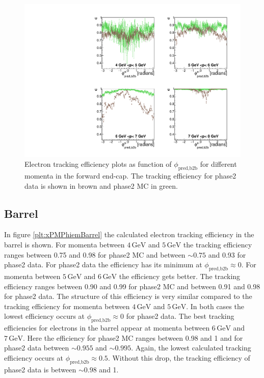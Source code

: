 \documentclass[a4paper,11pt,twosided,final,german,openbib,pdftex,listof=totoc,bibliography=totoc]{scrbook}
\begin{document}
\begin{figure}[!htbp]
	\centering
	\includegraphics[width=\textwidth]{Plots/master/xPMPhiemFC}
	\caption[Momentum $\phi_{\textrm{pred,b2b}}$ Electron Forward End-Cap Efficiency Phase2]{Electron tracking efficiency plots as function of $\phi_{\textrm{pred,b2b}}$ for different momenta in the forward end-cap. The tracking efficiency for phase2 data is shown in brown and phase2 MC in green.}
		\label{plt:xPMPhiemFC}
\end{figure}

\newpage

\subsection{Barrel}

In figure \ref{plt:xPMPhiemBarrel} the calculated electron tracking efficiency in the barrel is shown. For momenta between $4\,\textrm{GeV}$ and $5\,\textrm{GeV}$ the tracking efficiency ranges between 0.75 and 0.98 for phase2 MC and between $\sim 0.75$ and 0.93 for phase2 data. For phase2 data the efficiency has its minimum at $\phi_{\textrm{pred,b2b}} \approx 0$. For momenta between $5\,\textrm{GeV}$ and $6\,\textrm{GeV}$ the efficiency gets better. The tracking efficiency ranges between 0.90 and 0.99 for phase2 MC and between 0.91 and 0.98 for phase2 data. The structure of this efficiency is very similar compared to the tracking efficiency for momenta between $4\,\textrm{GeV}$ and $5\,\textrm{GeV}$. In both cases the lowest efficiency occurs at $\phi_{\textrm{pred,b2b}} \approx 0$ for phase2 data. The best tracking efficiencies for electrons in the barrel appear at momenta between $6\,\textrm{GeV}$ and $7\,\textrm{GeV}$. Here the efficiency for phase2 MC ranges between 0.98 and 1 and for phase2 data between $\sim 0.955$ and $\sim 0.995$. Again, the lowest calculated tracking efficiency occurs at  $\phi_{\textrm{pred,b2b}} \approx 0.5$. Without this drop, the tracking efficiency of phase2 data is between $\sim 0.98$ and 1. 
\end{document}
